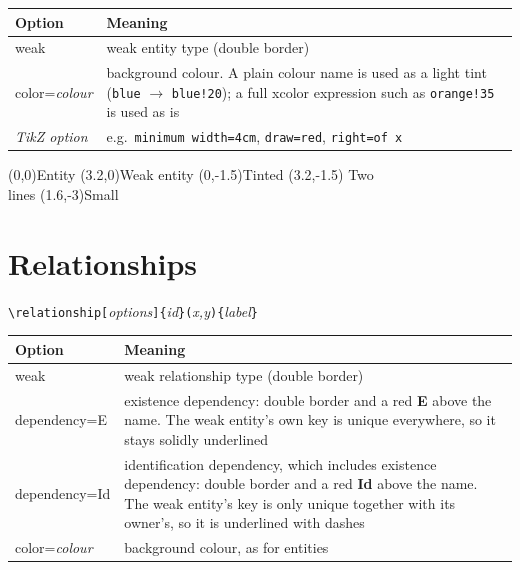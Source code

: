 \documentclass[10pt,a4paper]{article}
\newcommand\meta[1]{\textlangle\textit{#1}\textrangle}
\begin{document}
\begin{longtable}{@{}>{\ttfamily}p{3.3cm}p{12.5cm}@{}}
\toprule
\normalfont\textbf{Option} & \textbf{Meaning}\\\midrule
weak & weak entity type (double border)\\
color=\meta{colour} & background colour. A plain colour name is used as a
  light tint (\texttt{blue} $\to$ \texttt{blue!20}); a full xcolor
  expression such as \texttt{orange!35} is used as is\\
\meta{TikZ option} & e.g.\ \texttt{minimum width=4cm}, \texttt{draw=red},
  \texttt{right=of x}\\
\bottomrule
\end{longtable}

\begin{example}
\begin{erdiagram}
  (0,0){Entity}
  (3.2,0){Weak entity}
  (0,-1.5){Tinted}
  (3.2,-1.5)
     {Two\\lines}
     (1.6,-3){Small}
\end{erdiagram}
\end{example}

\section{Relationships}

\begin{center}
\verb|\relationship[|\meta{options}\verb|]{|\meta{id}\verb|}(|\meta{x,y}\verb|){|\meta{label}\verb|}|
\end{center}

\begin{longtable}{@{}>{\ttfamily}p{3.3cm}p{12.5cm}@{}}
\toprule
\normalfont\textbf{Option} & \textbf{Meaning}\\\midrule
weak & weak relationship type (double border)\\
dependency=E & existence dependency: double border and a red
  \textbf{E} above the name. The weak entity's own key is unique everywhere, so it stays
  solidly underlined\\
dependency=Id & identification dependency, which includes existence dependency: double border
  and a red \textbf{Id} above the name. The weak entity's key is only unique together with its
  owner's, so it is underlined with dashes\\
color=\meta{colour} & background colour, as for entities\\
\bottomrule
\end{longtable}
\end{document}
